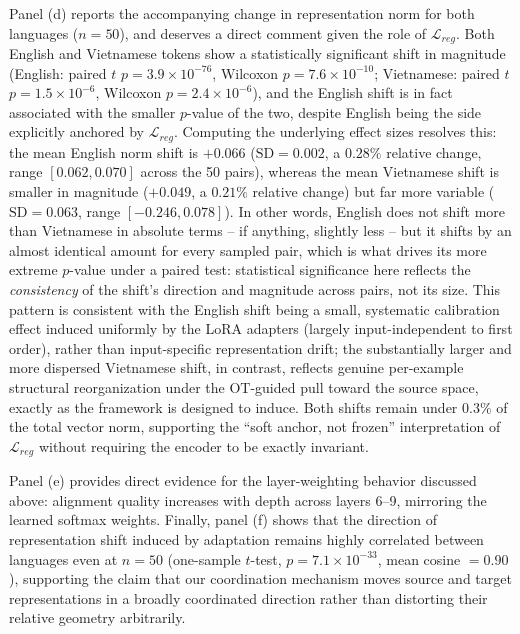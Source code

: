 \documentclass[11pt]{article}
\begin{document}
Panel (d) reports the accompanying change in representation norm for both languages ($n=50$), and deserves a direct comment given the role of $\mathcal{L}_{reg}$. Both English and Vietnamese tokens show a statistically significant shift in magnitude (English: paired $t$ $p=3.9\times10^{-76}$, Wilcoxon $p=7.6\times10^{-10}$; Vietnamese: paired $t$ $p=1.5\times10^{-6}$, Wilcoxon $p=2.4\times10^{-6}$), and the English shift is in fact associated with the smaller $p$-value of the two, despite English being the side explicitly anchored by $\mathcal{L}_{reg}$. Computing the underlying effect sizes resolves this: the mean English norm shift is $+0.066$ ($\mathrm{SD}=0.002$, a $0.28\%$ relative change, range $[0.062, 0.070]$ across the 50 pairs), whereas the mean Vietnamese shift is smaller in magnitude ($+0.049$, a $0.21\%$ relative change) but far more variable ($\mathrm{SD}=0.063$, range $[-0.246, 0.078]$). In other words, English does not shift more than Vietnamese in absolute terms -- if anything, slightly less -- but it shifts by an almost identical amount for every sampled pair, which is what drives its more extreme $p$-value under a paired test: statistical significance here reflects the \emph{consistency} of the shift's direction and magnitude across pairs, not its size. This pattern is consistent with the English shift being a small, systematic calibration effect induced uniformly by the LoRA adapters (largely input-independent to first order), rather than input-specific representation drift; the substantially larger and more dispersed Vietnamese shift, in contrast, reflects genuine per-example structural reorganization under the OT-guided pull toward the source space, exactly as the framework is designed to induce. Both shifts remain under $0.3\%$ of the total vector norm, supporting the ``soft anchor, not frozen'' interpretation of $\mathcal{L}_{reg}$ without requiring the encoder to be exactly invariant.

Panel (e) provides direct evidence for the layer-weighting behavior discussed above: alignment quality increases with depth across layers 6--9, mirroring the learned softmax weights. Finally, panel (f) shows that the direction of representation shift induced by adaptation remains highly correlated between languages even at $n=50$ (one-sample $t$-test, $p=7.1\times10^{-33}$, mean cosine $=0.90$), supporting the claim that our coordination mechanism moves source and target representations in a broadly coordinated direction rather than distorting their relative geometry arbitrarily.
\end{document}
